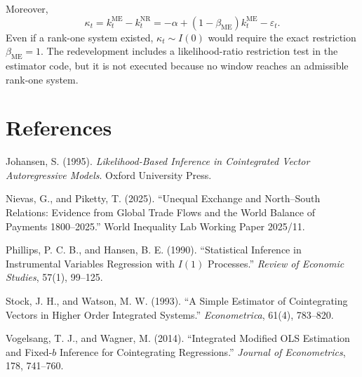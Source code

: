 \documentclass[11pt,a4paper]{article}
\begin{document}
Moreover,
\begin{equation}
\kappa_t=k_t^{\mathrm{ME}}-k_t^{\mathrm{NR}}
=-\alpha+\left(1-\beta_{\mathrm{ME}}\right)k_t^{\mathrm{ME}}-\varepsilon_t.
\end{equation}
Even if a rank-one system existed, \(\kappa_t\sim I(0)\) would require the exact restriction \(\beta_{\mathrm{ME}}=1\). The redevelopment includes a likelihood-ratio restriction test in the estimator code, but it is not executed because no window reaches an admissible rank-one system.

\FloatBarrier
\section*{References}

Johansen, S. (1995). \textit{Likelihood-Based Inference in Cointegrated Vector Autoregressive Models}. Oxford University Press.

Nievas, G., and Piketty, T. (2025). ``Unequal Exchange and North--South Relations: Evidence from Global Trade Flows and the World Balance of Payments 1800--2025.'' World Inequality Lab Working Paper 2025/11.

Phillips, P. C. B., and Hansen, B. E. (1990). ``Statistical Inference in Instrumental Variables Regression with \(I(1)\) Processes.'' \textit{Review of Economic Studies}, 57(1), 99--125.

Stock, J. H., and Watson, M. W. (1993). ``A Simple Estimator of Cointegrating Vectors in Higher Order Integrated Systems.'' \textit{Econometrica}, 61(4), 783--820.

Vogelsang, T. J., and Wagner, M. (2014). ``Integrated Modified OLS Estimation and Fixed-\(b\) Inference for Cointegrating Regressions.'' \textit{Journal of Econometrics}, 178, 741--760.
\end{document}
